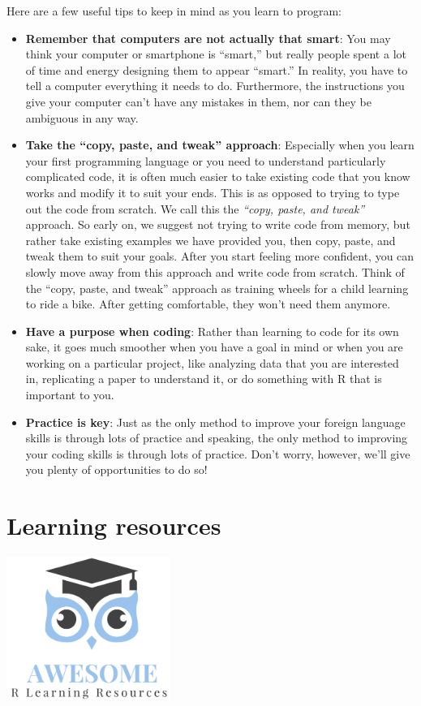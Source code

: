 \documentclass[
  12pt,
  oneside]{book}
\providecommand{\tightlist}{%
  \setlength{\itemsep}{0pt}\setlength{\parskip}{0pt}}
\theoremstyle{definition}
\theoremstyle{definition}
\theoremstyle{definition}
\theoremstyle{definition}
\theoremstyle{remark}
\begin{document}
Here are a few useful tips to keep in mind as you learn to program:

\begin{itemize}
\tightlist
\item
  \textbf{Remember that computers are not actually that smart}: You may think your computer or smartphone is ``smart,'' but really people spent a lot of time and energy designing them to appear ``smart.'' In reality, you have to tell a computer everything it needs to do. Furthermore, the instructions you give your computer can't have any mistakes in them, nor can they be ambiguous in any way.
\item
  \textbf{Take the ``copy, paste, and tweak'' approach}: Especially when you learn your first programming language or you need to understand particularly complicated code, it is often much easier to take existing code that you know works and modify it to suit your ends. This is as opposed to trying to type out the code from scratch. We call this the \emph{``copy, paste, and tweak''} approach. So early on, we suggest not trying to write code from memory, but rather take existing examples we have provided you, then copy, paste, and tweak them to suit your goals. After you start feeling more confident, you can slowly move away from this approach and write code from scratch. Think of the ``copy, paste, and tweak'' approach as training wheels for a child learning to ride a bike. After getting comfortable, they won't need them anymore.
\item
  \textbf{Have a purpose when coding}: Rather than learning to code for its own sake, it goes much smoother when you have a goal in mind or when you are working on a particular project, like analyzing data that you are interested in, replicating a paper to understand it, or do something with R that is important to you.
\item
  \textbf{Practice is key}: Just as the only method to improve your foreign language skills is through lots of practice and speaking, the only method to improving your coding skills is through lots of practice. Don't worry, however, we'll give you plenty of opportunities to do so!
\end{itemize}

\hypertarget{Rlearninglit}{%
\section{Learning resources}\label{Rlearninglit}}

\includegraphics[width=0.4\textwidth,height=\textheight]{fig/aweres.png}
\end{document}
